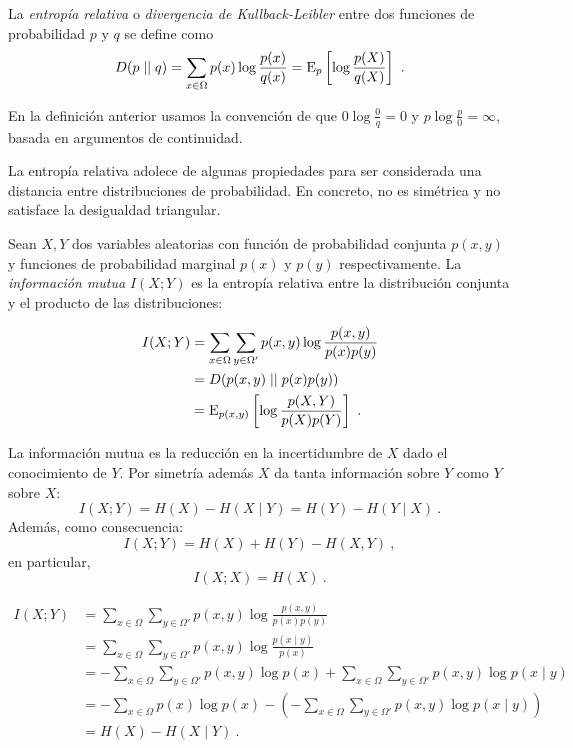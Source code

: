 La \emph{entropía relativa} o \emph{divergencia de Kullback-Leibler}
entre dos funciones de probabilidad \(p\) y \(q\) se define como
\[D(p\mid\mid q)=\sum_{x\in\Omega}p(x)\log\frac{p(x)}{q(x)}=\mathrm{E}_{p}\left[\log\frac{p(X)}{q(X)}\right]~.\]

En la definición anterior usamos la convención de que
\(0\log\frac 0 q=0\) y \(p\log\frac p 0=\infty\), basada en argumentos
de continuidad.

La entropía relativa adolece de algunas propiedades para ser considerada
una distancia entre distribuciones de probabilidad. En concreto, no es
simétrica y no satisface la desigualdad triangular.

Sean \(X, Y\) dos variables aleatorias con función de probabilidad
conjunta \(p(x,y)\) y funciones de probabilidad marginal \(p(x)\) y
\(p(y)\) respectivamente. La \emph{información mutua} \(I(X;Y)\) es la
entropía relativa entre la distribución conjunta y el producto de las
distribuciones:

\begin{align*}
  I(X;Y)&=\sum_{x\in\Omega}\sum_{y\in\Omega'}p(x,y)\log\frac{p(x,y)}{p(x)p(y)}\\
        &=D(p(x,y)\mid\mid p(x)p(y))\\
        &=\mathrm{E}_{p(x,y)}\left[\log\frac{p(X,Y)}{p(X)p(Y)}\right]~.
\end{align*}


\theob
La información mutua es la reducción en la incertidumbre de \(X\) dado
el conocimiento de \(Y\). Por simetría además \(X\) da tanta información
sobre \(Y\) como \(Y\) sobre \(X\):
\[I(X;Y)=H(X)-H(X\mid Y)=H(Y)-H(Y\mid X)~.\] Además, como consecuencia:
\[I(X;Y)=H(X)+H(Y)-H(X,Y)~,\] en particular, \[I(X;X)=H(X)~.\] \proofb

\begin{align*}
  I(X;Y)&=\sum_{x\in\Omega}\sum_{y\in\Omega'}p(x,y)\log\frac{p(x,y)}{p(x)p(y)}\\
        &=\sum_{x\in\Omega}\sum_{y\in\Omega'}p(x,y)\log\frac{p(x\mid y)}{p(x)}\\
        &=-\sum_{x\in\Omega}\sum_{y\in\Omega'}p(x,y)\log p(x) + \sum_{x\in\Omega}\sum_{y\in\Omega'}p(x,y)\log p(x\mid y)\\
        &=-\sum_{x\in\Omega}p(x)\log p(x) -\left(- \sum_{x\in\Omega}\sum_{y\in\Omega'}p(x,y)\log p(x\mid y)\right)\\
        &=H(X)-H(X\mid Y)~.
\end{align*}

